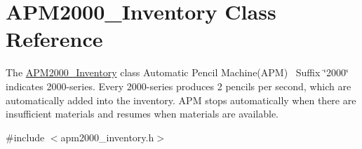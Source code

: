 \hypertarget{classAPM2000__Inventory}{}\section{A\+P\+M2000\+\_\+\+Inventory Class Reference}
\label{classAPM2000__Inventory}


The \hyperlink{classAPM2000__Inventory}{A\+P\+M2000\+\_\+\+Inventory} class Automatic Pencil Machine(\+A\+P\+M)~\newline
Suffix \char`\"{}2000\char`\"{} indicates 2000-\/series. Every 2000-\/series produces 2 pencils per second, which are automatically added into the inventory. A\+PM stops automatically when there are insufficient materials and resumes when materials are available.  




{\ttfamily \#include $<$apm2000\+\_\+inventory.\+h$>$}

